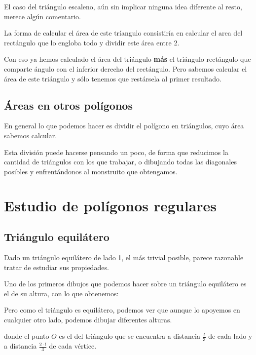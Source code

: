 \documentclass{apuntes}
\begin{document}
El caso del triángulo escaleno, aún sin implicar ninguna idea diferente al resto, merece algún comentario.

La forma de calcular el área de este tríangulo consistiría en calcular el area del rectángulo que lo engloba todo y dividir este área entre 2.

Con eso ya hemos calculado el área del triángulo \textbf{más} el triángulo rectángulo que comparte ángulo con el inferior derecho del rectángulo. Pero sabemos calcular el área de este triángulo y sólo tenemos que restársela al primer resultado.

\subsection{Áreas en otros polígonos}
En general lo que podemos hacer es dividir el polígono en triángulos, cuyo área sabemos calcular.

Esta división puede hacerse pensando un poco, de forma que reducimos la cantidad de triángulos con los que trabajar, o dibujando todas las diagonales posibles y enfrentándonos al monstruito que obtengamos.

\section{Estudio de polígonos regulares}
\subsection{Triángulo equilátero}
Dado un triángulo equilátero de lado 1, el más trivial posible, parece razonable tratar de estudiar sus propiedades.

Uno de los primeros dibujos que podemos hacer sobre un triángulo equilátero es el de su altura, con lo que obtenemos:
\begin{center}
\end{center}

Pero como el triángulo es equilátero, podemos ver que aunque lo apoyemos en cualquier otro lado, podemos dibujar diferentes alturas.

\begin{center}
\end{center}

donde el punto $O$ es el  del triángulo que se encuentra a distancia $\frac{l}{3}$ de cada lado y a distancia $\frac{2\cdot l}{3}$ de cada vértice.
\end{document}
